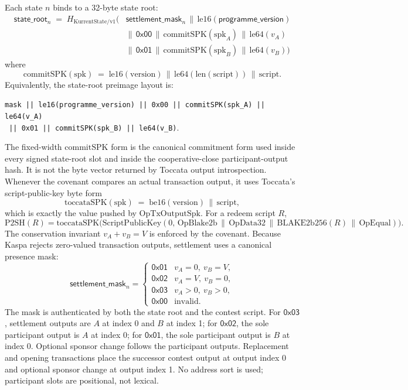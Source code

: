 \documentclass[10pt,a4paper]{article}
\begin{document}
Each state $n$ binds to a 32-byte state root:
\[
  \begin{aligned}
  \mathsf{state\_root}_n \;=\; H_{\mathrm{KurrentState/v1}}\bigl(&
   \mathsf{settlement\_mask}_n \,\|\, \mathrm{le16}(\mathsf{programme\_version}) \\
   & \|\, \mathsf{0x00} \,\|\, \mathrm{commitSPK}(\mathrm{spk}_A)
    \,\|\, \mathrm{le64}(v_A) \\
   & \|\, \mathsf{0x01} \,\|\, \mathrm{commitSPK}(\mathrm{spk}_B)
    \,\|\, \mathrm{le64}(v_B) \bigr)
  \end{aligned}
\]
where
\[
  \mathrm{commitSPK}(\mathrm{spk}) \;=\; \mathrm{le16}(\mathrm{version}) \,\|\, \mathrm{le64}(\mathrm{len}(\mathrm{script})) \,\|\, \mathrm{script}.
\]
Equivalently, the state-root preimage layout is:
\begin{center}
\small
\texttt{mask || le16(programme\_version) || 0x00 || commitSPK(spk\_A) || le64(v\_A)}\\
\texttt{     || 0x01 || commitSPK(spk\_B) || le64(v\_B)}.
\end{center}
The fixed-width $\mathrm{commitSPK}$ form is the canonical commitment form used inside every signed state-root slot and inside the cooperative-close participant-output hash. It is not the byte vector returned by Toccata output introspection. Whenever the covenant compares an actual transaction output, it uses Toccata's script-public-key byte form
\[
  \mathrm{toccataSPK}(\mathrm{spk}) \;=\; \mathrm{be16}(\mathrm{version}) \,\|\, \mathrm{script},
\]
which is exactly the value pushed by $\mathrm{OpTxOutputSpk}$. For a redeem script $R$,
\[
  \mathrm{P2SH}(R) =
  \mathrm{toccataSPK}\bigl(\mathrm{ScriptPublicKey}(0,\,
  \mathrm{OpBlake2b}\,\|\,\mathrm{OpData32}\,\|\,\mathrm{BLAKE2b256}(R)\,\|\,\mathrm{OpEqual})\bigr).
\]
The conservation invariant $v_A + v_B = V$ is enforced by the covenant. Because Kaspa rejects zero-valued transaction outputs, settlement uses a canonical presence mask:
\[
  \mathsf{settlement\_mask}_n =
  \begin{cases}
  \mathsf{0x01} & v_A = 0,\ v_B = V,\\
  \mathsf{0x02} & v_A = V,\ v_B = 0,\\
  \mathsf{0x03} & v_A > 0,\ v_B > 0,\\
  \mathsf{0x00} & \text{invalid.}
  \end{cases}
\]
The mask is authenticated by both the state root and the contest script. For $\mathsf{0x03}$, settlement outputs are $A$ at index 0 and $B$ at index 1; for $\mathsf{0x02}$, the sole participant output is $A$ at index 0; for $\mathsf{0x01}$, the sole participant output is $B$ at index 0. Optional sponsor change follows the participant outputs. Replacement and opening transactions place the successor contest output at output index 0 and optional sponsor change at output index 1. No address sort is used; participant slots are positional, not lexical.
\end{document}
